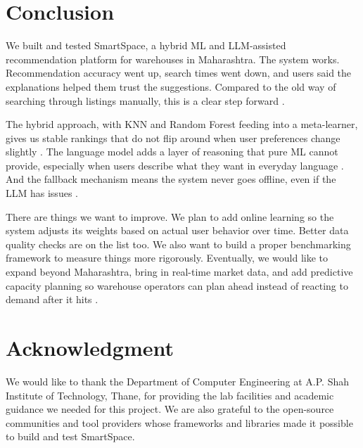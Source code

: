 \documentclass[pdflatex,sn-mathphys-num]{sn-jnl}
\theoremstyle{thmstyleone}
\theoremstyle{thmstyletwo}
\theoremstyle{thmstylethree}
\begin{document}

\section{Conclusion}\label{sec5}

We built and tested SmartSpace, a hybrid ML and LLM-assisted
recommendation platform for warehouses in Maharashtra.
The system works.
Recommendation accuracy went up, search times went down,
and users said the explanations helped them trust the
suggestions.
Compared to the old way of searching through listings
manually, this is a clear step forward
\cite{b2, b5, b8}.

The hybrid approach, with KNN and Random Forest feeding into
a meta-learner, gives us stable rankings that do not flip
around when user preferences change slightly \cite{b10}.
The language model adds a layer of reasoning that pure ML
cannot provide, especially when users describe what they
want in everyday language \cite{b3, b7}.
And the fallback mechanism means the system never goes
offline, even if the LLM has issues \cite{b4}.

There are things we want to improve.
We plan to add online learning so the system adjusts its
weights based on actual user behavior over time.
Better data quality checks are on the list too.
We also want to build a proper benchmarking framework to
measure things more rigorously.
Eventually, we would like to expand beyond Maharashtra,
bring in real-time market data, and add predictive capacity
planning so warehouse operators can plan ahead instead of
reacting to demand after it hits \cite{b1, b8}.


\section*{Acknowledgment}

We would like to thank the Department of Computer Engineering
at A.P. Shah Institute of Technology, Thane, for providing
the lab facilities and academic guidance we needed for this
project.
We are also grateful to the open-source communities and tool
providers whose frameworks and libraries made it possible
to build and test SmartSpace.
\end{document}

